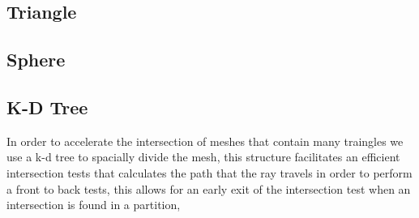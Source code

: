 \subsection{Triangle}
\subsection{Sphere}
\subsection{K-D Tree}
In order to accelerate the intersection of meshes that contain many traingles we use a k-d tree to spacially divide the mesh,
this structure facilitates an efficient intersection tests that calculates the path that the ray travels in order to perform
a front to back tests, this allows for an early exit of the intersection test when an intersection is found in a partition,

